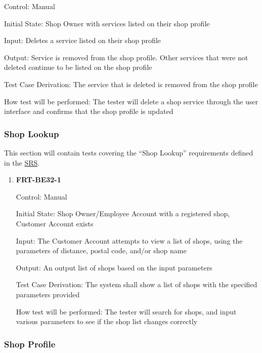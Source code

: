 \documentclass[12pt, titlepage]{article}
\begin{document}
\begin{enumerate}
	      Control: Manual

	      Initial State: Shop Owner with services listed on their shop profile

	      Input: Deletes a service listed on their shop profile

	      Output: Service is removed from the shop profile. Other services that were not deleted continue to
	      be listed on the shop profile

	      Test Case Derivation: The service that is deleted is removed from the shop profile

	      How test will be performed: The tester will delete a shop service through the user interface and
	      confirms that the shop profile is updated

\end{enumerate}

\subsubsection{Shop Lookup}

This section will contain tests covering the ``Shop Lookup'' requirements defined in the
\href{https://github.com/arkinmodi/project-sayyara/blob/main/docs/SRS/SRS.pdf}{SRS}.

\begin{enumerate}
	\item \textbf{FRT-BE32-1}

	      Control: Manual

	      Initial State: Shop Owner/Employee Account with a registered shop, Customer Account exists

	      Input: The Customer Account attempts to view a list of shops, using the parameters of distance,
	      postal code, and/or shop name

	      Output: An output list of shops based on the input parameters

	      Test Case Derivation: The system shall show a list of shops with the specified parameters provided

	      How test will be performed: The tester will search for shops, and input various parameters to see
	      if the shop list changes correctly
\end{enumerate}

\subsubsection{Shop Profile}
\end{document}
